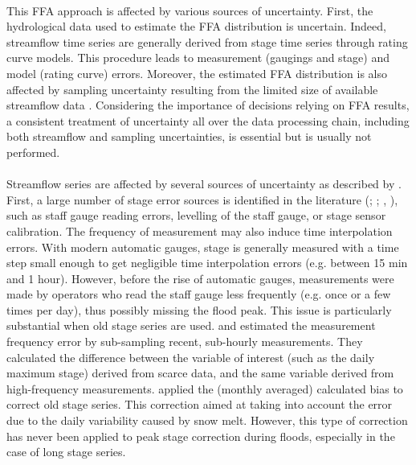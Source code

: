 \documentclass[11pt]{article}
\begin{document}
    \paragraph{}
    This FFA approach is affected by various sources of uncertainty. First, the hydrological data used to estimate the FFA distribution is uncertain. Indeed,
    streamflow time series are generally derived from stage time series through rating curve models. This procedure leads to measurement (gaugings and stage) and model (rating curve) errors. Moreover, the estimated FFA distribution is also affected by sampling uncertainty resulting from the limited size of available streamflow data \citep{kjeldsen_uncertainty_2011}. Considering the importance of decisions relying on FFA results, a consistent treatment of uncertainty all over the data processing chain, including both streamflow and sampling uncertainties, is essential but is usually not performed.
    
    \paragraph{}
    Streamflow series are affected by several sources of uncertainty as described by \citet{mcmillan_benchmarking_2012}. First, a large number of stage error sources is identified in the literature (\citet{van_der_made_determination_1982}; \citet{petersen-overleir_uncertainty_2005}; \citet{mcmillan_benchmarking_2012}, \citet{horner_impact_2018}), such as staff gauge reading errors, levelling of the staff gauge, or stage sensor calibration. The frequency of measurement may also induce time interpolation errors. With modern automatic gauges, stage is generally measured with a time step small enough to get negligible time interpolation errors (e.g. between 15 min and 1 hour). However, before the rise of automatic gauges, measurements were made by operators who read the staff gauge less frequently (e.g. once or a few times per day), thus possibly missing the flood peak. This issue is particularly substantial when old stage series are used. \citet{hamilton_quantifying_2012} and \citet{kuentz_hydrometrie_2014} estimated the measurement frequency error by sub-sampling recent, sub-hourly measurements. They calculated the difference between the variable of interest (such as the daily maximum stage) derived from scarce data, and the same variable derived from high-frequency measurements. \citet{kuentz_hydrometrie_2014} applied the (monthly averaged) calculated bias to correct old stage series. This correction aimed at taking into account the error due to the daily variability caused by snow melt. However, this type of correction has never been applied to peak stage correction during floods, especially in the case of long stage series.
    
\end{document}
